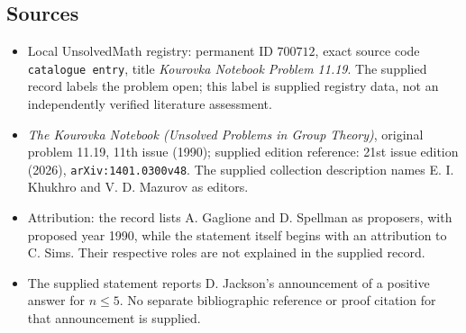 \documentclass[11pt]{article}
\begin{document}
\subsection{Sources}
\begin{itemize}
\item Local UnsolvedMath registry: permanent ID \(700712\), exact source code \texttt{catalogue entry}, title \emph{Kourovka Notebook Problem 11.19}. The supplied record labels the problem open; this label is supplied registry data, not an independently verified literature assessment.
\item \emph{The Kourovka Notebook (Unsolved Problems in Group Theory)}, original problem 11.19, 11th issue (1990); supplied edition reference: 21st issue edition (2026), \texttt{arXiv:1401.0300v48}. The supplied collection description names E. I. Khukhro and V. D. Mazurov as editors.
\item Attribution: the record lists A. Gaglione and D. Spellman as proposers, with proposed year 1990, while the statement itself begins with an attribution to C. Sims. Their respective roles are not explained in the supplied record.
\item The supplied statement reports D. Jackson's announcement of a positive answer for \(n\leq 5\). No separate bibliographic reference or proof citation for that announcement is supplied.
\end{itemize}
\end{document}
